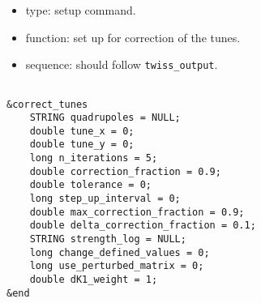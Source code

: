 \documentclass[11pt]{article}
\begin{document}
\begin{itemize}
\item type: setup command.
\item function: set up for correction of the tunes.
\item sequence: should follow \verb|twiss_output|.
\end{itemize}

\begin{verbatim}

&correct_tunes
    STRING quadrupoles = NULL;
    double tune_x = 0;
    double tune_y = 0;
    long n_iterations = 5;
    double correction_fraction = 0.9;
    double tolerance = 0;
    long step_up_interval = 0;
    double max_correction_fraction = 0.9;
    double delta_correction_fraction = 0.1;
    STRING strength_log = NULL;
    long change_defined_values = 0;
    long use_perturbed_matrix = 0;
    double dK1_weight = 1;
&end
\end{verbatim}
\end{document}
